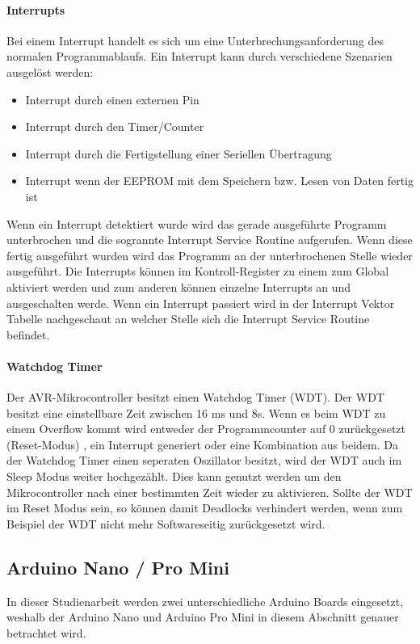 \paragraph{Interrupts}
Bei einem Interrupt handelt es sich um eine Unterbrechungsanforderung des normalen Programmablaufs. Ein Interrupt kann durch verschiedene Szenarien ausgelöst werden:
\begin{itemize}
\item Interrupt durch einen externen Pin
\item Interrupt durch den Timer/Counter
\item Interrupt durch die Fertigstellung einer Seriellen Übertragung
\item Interrupt wenn der EEPROM mit dem Speichern bzw. Lesen von Daten fertig ist
\end{itemize}
Wenn ein Interrupt detektiert wurde wird das gerade ausgeführte Programm unterbrochen und die sogrannte Interrupt Service Routine aufgerufen. Wenn diese fertig ausgeführt wurden wird das Programm an der unterbrochenen Stelle wieder ausgeführt. 
Die Interrupts können im Kontroll-Register zu einem zum Global aktiviert werden und zum anderen können einzelne Interrupts an und ausgeschalten werde. Wenn ein Interrupt passiert wird in der Interrupt Vektor Tabelle nachgeschaut an welcher Stelle sich die Interrupt Service Routine befindet.
\paragraph{Watchdog Timer}
Der AVR-Mikrocontroller besitzt einen Watchdog Timer (\ac{WDT}). Der WDT besitzt eine einstellbare Zeit zwischen 16 ms und 8s. Wenn es beim WDT zu einem Overflow kommt wird entweder der Programmcounter auf 0 zurückgesetzt (Reset-Modus) , ein Interrupt generiert oder eine Kombination aus beidem. Da der Watchdog Timer einen seperaten Oszillator besitzt, wird der  WDT auch im Sleep Modus weiter hochgezählt. Dies kann genutzt werden um den Mikrocontroller nach einer bestimmten Zeit wieder zu aktivieren. Sollte der WDT im Reset Modus sein, so können damit Deadlocks verhindert werden, wenn zum Beispiel der WDT nicht mehr Softwareseitig zurückgesetzt wird.

\subsection{Arduino Nano /  Pro Mini}
In dieser Studienarbeit werden zwei unterschiedliche Arduino Boards eingesetzt, weshalb der Arduino Nano und Arduino Pro Mini in diesem Abschnitt genauer betrachtet wird.

